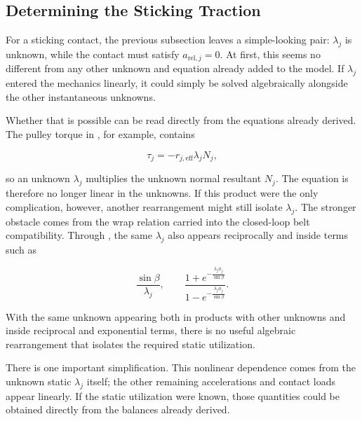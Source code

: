 \documentclass[11pt]{report}
\numberwithin{equation}{section}
\begin{document}
\subsection{Determining the Sticking Traction}
\label{sec:sticking_traction_closure}

For a sticking contact, the previous subsection leaves a simple-looking pair:
\(\lambda_j\) is unknown, while the contact must satisfy
\(a_{\mathrm{rel},j}=0\). At first, this seems no different from any other
unknown and equation already added to the model. If \(\lambda_j\) entered the
mechanics linearly, it could simply be solved algebraically alongside the
other instantaneous unknowns.

Whether that is possible can be read directly from the equations already
derived. The pulley torque in , for
example, contains

\begin{equation}
    \tau_j
    =
    -r_{j,\mathrm{eff}}\lambda_jN_j,
\label{eq:sticking_closure_contact_product}
\end{equation}

so an unknown \(\lambda_j\) multiplies the unknown normal resultant \(N_j\).
The equation is therefore no longer linear in the unknowns. If this product
were the only complication, however, another rearrangement might still isolate
\(\lambda_j\). The stronger obstacle comes from the wrap relation carried into
the closed-loop belt compatibility. Through
, the same \(\lambda_j\) also
appears reciprocally and inside terms such as

\begin{equation}
    \frac{\sin\beta}{\lambda_j},
    \qquad
    \frac{
        1+e^{-\frac{\lambda_j\phi_j}{\sin\beta}}
    }{
        1-e^{-\frac{\lambda_j\phi_j}{\sin\beta}}
    }.
\label{eq:sticking_closure_nonlinear_terms}
\end{equation}

With the same unknown appearing both
in products with other unknowns and inside reciprocal and exponential terms,
there is no useful algebraic rearrangement that isolates the required static
utilization.

There is one important simplification. This nonlinear dependence comes from
the unknown static \(\lambda_j\) itself; the other remaining accelerations and
contact loads appear linearly. If the static utilization were known, those
quantities could be obtained directly from the balances already derived.
\end{document}
